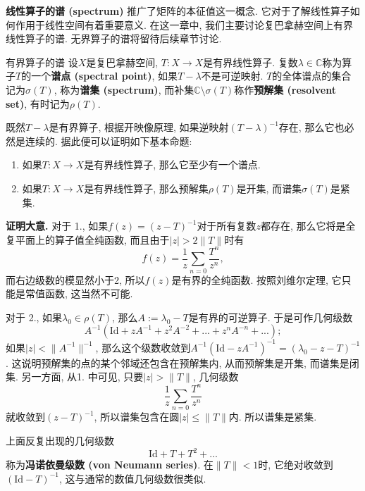 \textbf{线性算子的谱 (spectrum)} 推广了矩阵的本征值这一概念. 它对于了解线性算子如何作用于线性空间有着重要意义. 在这一章中, 我们主要讨论复巴拿赫空间上有界线性算子的谱. 无界算子的谱将留待后续章节讨论.

\begin{definition}{有界算子的谱}
设$X$是复巴拿赫空间, $T:X\to X$是有界线性算子. 复数$\lambda\in\mathbb{C}$称为算子$T$的一个\textbf{谱点 (spectral point)}, 如果$T-\lambda$不是可逆映射. $T$的全体谱点的集合记为$\sigma(T)$, 称为\textbf{谱集 (spectrum)}, 而补集$\mathbb{C}\setminus\sigma(T)$称作\textbf{预解集 (resolvent set)}, 有时记为$\rho(T)$.
\end{definition}

既然$T-\lambda$是有界算子, 根据开映像原理, 如果逆映射$(T-\lambda)^{-1}$存在, 那么它也必然是连续的. 据此便可以证明如下基本命题:

\begin{theorem}{}
\begin{enumerate}
\item 如果$T:X\to X$是有界线性算子, 那么它至少有一个谱点.
\item 如果$T:X\to X$是有界线性算子, 那么预解集$\rho(T)$是开集, 而谱集$\sigma(T)$是紧集.
\end{enumerate}
\end{theorem}
\textbf{证明大意.} 
对于 1., 如果$f(z)=(z-T)^{-1}$对于所有复数$z$都存在, 那么它将是全复平面上的算子值全纯函数, 而且由于$|z|>2\|T\|$时有
$$
f(z)=\frac{1}{z}\sum_{n=0}\frac{T^n}{z^n},
$$
而右边级数的模显然小于2, 所以$f(z)$是有界的全纯函数. 按照刘维尔定理, 它只能是常值函数, 这当然不可能.

对于 2., 如果$\lambda_0\in\rho(T)$, 那么$A:=\lambda_0-T$是有界的可逆算子. 于是可作几何级数
$$
A^{-1}(\text{Id}+zA^{-1}+z^2A^{-2}+...+z^nA^{-n}+...);
$$
如果$|z|<\|A^{-1}\|^{-1}$, 那么这个级数收敛到$A^{-1}(\text{Id}-zA^{-1})^{-1}=(\lambda_0-z-T)^{-1}$. 这说明预解集的点的某个邻域还包含在预解集内, 从而预解集是开集, 而谱集是闭集. 另一方面, 从1. 中可见, 只要$|z|>\|T\|$, 几何级数
$$
\frac{1}{z}\sum_{n=0}\frac{T^n}{z^n}
$$
就收敛到$(z-T)^{-1}$, 所以谱集包含在圆$|z|\leq\|T\|$内. 所以谱集是紧集.

上面反复出现的几何级数
$$
\text{Id}+T+T^2+...
$$
称为\textbf{冯诺依曼级数 (von Neumann series)}. 在$\|T\|<1$时, 它绝对收敛到$(\text{Id}-T)^{-1}$, 这与通常的数值几何级数很类似.
